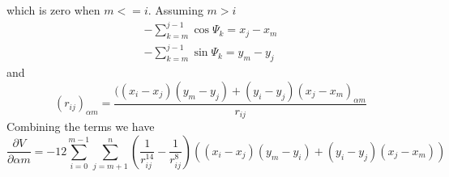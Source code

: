 \documentclass[conference,letterpaper]{IEEEtran}
\begin{document}
which is zero when $m <= i$. Assuming $m > i$
\begin{equation}
    \begin{split}
        -\sum_{k=m}^{j-1}\cos{\Psi_{k}}=x_{j}-x_{m} \\
        -\sum_{k=m}^{j-1}\sin{\Psi_{k}}=y_{m}-y_{j}
    \end{split}
\end{equation}
and
\begin{equation}
    (r_{ij})_{\alpha m} = \frac{((x_{i} - x_{j})(y_{m} - y_{j}) + (y_{i} - y_{j})(x_{j} - x_{m})_{\alpha m}}{r_{ij}}
\end{equation}
Combining the terms we have
\begin{equation}
    \frac{\partial V}{\partial \alpha m} = -12 \sum_{i=0}^{m-1}\sum_{j=m+1}^{n}(\frac{1}{r_{ij}^{14}} - \frac{1}{r_{ij}^{8}})((x_{i}-x_{j})(y_{m}-y_{i})+(y_{i}-y_{j})(x_{j}-x_{m}))
\end{equation}
%
%
\end{document}
